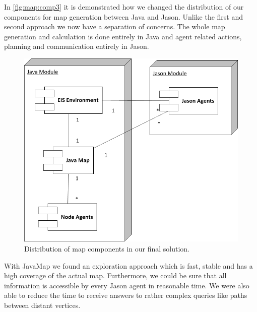 In \autoref{fig:map:comp3} it is demonstrated how we changed the distribution of our components for map generation between Java and Jason.
Unlike the first and second approach we now have a separation of concerns.
The whole map generation and calculation is done entirely in Java and agent related actions, planning and communication entirely in Jason.
\begin{figure}
  \centering
  \includegraphics[width=0.6\linewidth]{images/map_comp_3.png}
  \caption{Distribution of map components in our final solution.}
  \label{fig:map:comp3}
\end{figure}

With JavaMap we found an exploration approach which is fast, stable and has a high coverage of the actual map.
Furthermore, we could be sure that all information is accessible by every Jason agent in reasonable time.
We were also able to reduce the time to receive answers to rather complex queries like paths between distant vertices.
